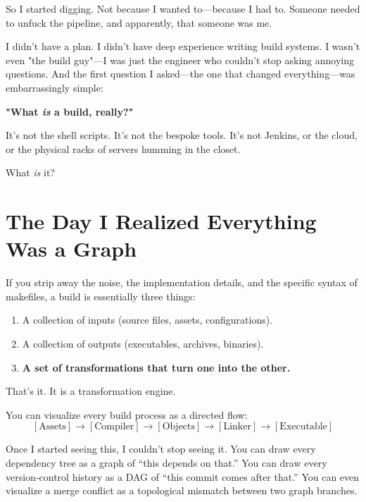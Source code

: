 So I started digging. Not because I wanted to—because I had to. Someone needed to unfuck the pipeline, and apparently, that someone was me.

I didn't have a plan. I didn't have deep experience writing build systems. I wasn't even "the build guy"—I was just the engineer who couldn't stop asking annoying questions. And the first question I asked—the one that changed everything—was embarrassingly simple:

\textbf{"What \textit{is} a build, really?"}

It's not the shell scripts. It's not the bespoke tools. It's not Jenkins, or the cloud, or the physical racks of servers humming in the closet. 

What \textit{is} it?

\section{The Day I Realized Everything Was a Graph}
\label{sec:day-i-realized}

If you strip away the noise, the implementation details, and the specific syntax of makefiles, a build is essentially three things:
\begin{enumerate}
    \item A collection of inputs (source files, assets, configurations).
    \item A collection of outputs (executables, archives, binaries).
    \item \textbf{A set of transformations that turn one into the other.}
\end{enumerate}

That's it. It is a transformation engine.

You can visualize every build process as a directed flow:
\[
[\text{Assets}] \rightarrow [\text{Compiler}] \rightarrow [\text{Objects}] \rightarrow [\text{Linker}] \rightarrow [\text{Executable}]
\]

Once I started seeing this, I couldn't stop seeing it. You can draw every dependency tree as a graph of ``this depends on that.'' You can draw every version-control history as a DAG of ``this commit comes after that.'' You can even visualize a merge conflict as a topological mismatch between two graph branches.

